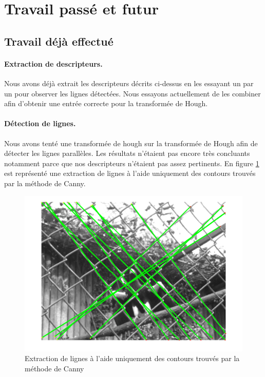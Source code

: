 \documentclass[10pt,a4paper]{article}
\begin{document}
\section{Travail passé et futur}
\subsection{Travail déjà effectué}
\paragraph{Extraction de descripteurs. } Nous avons déjà extrait les descripteurs décrits ci-dessus en les essayant un par un pour observer les lignes détectées. Nous essayons actuellement de les combiner afin d'obtenir une entrée correcte pour la transformée de Hough.

\paragraph{Détection de lignes. } Nous avons tenté une transformée de hough sur la transformée de Hough afin de détecter les lignes parallèles. Les résultats n'étaient pas encore très concluants notamment parce que nos descripteurs n'étaient pas assez pertinents. En figure \ref{hough} est représenté une extraction de lignes à l'aide uniquement des contours trouvés par la méthode de Canny.

\begin{figure}[ht!]
\begin{center}
\includegraphics[scale=0.3]{fig/hough.png}
\caption{\label{hough}Extraction de lignes à l'aide uniquement des contours trouvés par la méthode de Canny}
\end{center}
\end{figure}
\end{document}

